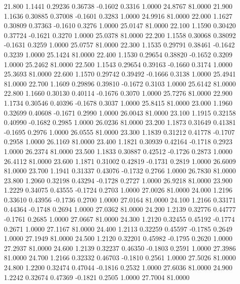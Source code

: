   21.800   1.1441   0.29236   0.36738  -0.1602   0.3316   1.0000  24.8767  81.0000
  21.900   1.1636   0.30885   0.37008  -0.1601   0.3283   1.0000  24.9916  81.0000
  22.000   1.1627   0.30809   0.37363  -0.1610   0.3276   1.0000  25.0147  81.0000
  22.100   1.1590   0.30420   0.37724  -0.1621   0.3270   1.0000  25.0378  81.0000
  22.200   1.1558   0.30068   0.38092  -0.1631   0.3259   1.0000  25.0757  81.0000
  22.300   1.1535   0.29791   0.38461  -0.1642   0.3239   1.0000  25.1424  81.0000
  22.400   1.1530   0.29654   0.38820  -0.1652   0.3209   1.0000  25.2462  81.0000
  22.500   1.1543   0.29654   0.39163  -0.1660   0.3174   1.0000  25.3693  81.0000
  22.600   1.1570   0.29742   0.39492  -0.1666   0.3138   1.0000  25.4941  81.0000
  22.700   1.1609   0.29896   0.39810  -0.1672   0.3103   1.0000  25.6142  81.0000
  22.800   1.1660   0.30130   0.40114  -0.1676   0.3070   1.0000  25.7276  81.0000
  22.900   1.1734   0.30546   0.40396  -0.1678   0.3037   1.0000  25.8415  81.0000
  23.000   1.1960   0.32699   0.40608  -0.1671   0.2990   1.0000  26.0043  81.0000
  23.100   1.1915   0.32158   0.40990  -0.1682   0.2985   1.0000  26.0236  81.0000
  23.200   1.1873   0.31649   0.41381  -0.1695   0.2976   1.0000  26.0555  81.0000
  23.300   1.1839   0.31212   0.41778  -0.1707   0.2958   1.0000  26.1169  81.0000
  23.400   1.1821   0.30939   0.42164  -0.1718   0.2923   1.0000  26.2374  81.0000
  23.500   1.1833   0.30887   0.42512  -0.1726   0.2873   1.0000  26.4112  81.0000
  23.600   1.1871   0.31002   0.42819  -0.1731   0.2819   1.0000  26.6009  81.0000
  23.700   1.1941   0.31337   0.43076  -0.1732   0.2766   1.0000  26.7830  81.0000
  23.800   1.2060   0.32198   0.43294  -0.1728   0.2727   1.0000  26.9218  81.0000
  23.900   1.2229   0.34075   0.43555  -0.1724   0.2703   1.0000  27.0026  81.0000
  24.000   1.2196   0.33610   0.43956  -0.1736   0.2700   1.0000  27.0164  81.0000
  24.100   1.2166   0.33171   0.44364  -0.1748   0.2694   1.0000  27.0362  81.0000
  24.200   1.2139   0.32776   0.44777  -0.1761   0.2685   1.0000  27.0667  81.0000
  24.300   1.2120   0.32455   0.45192  -0.1774   0.2671   1.0000  27.1167  81.0000
  24.400   1.2113   0.32259   0.45597  -0.1785   0.2649   1.0000  27.1949  81.0000
  24.500   1.2120   0.32201   0.45982  -0.1795   0.2620   1.0000  27.2937  81.0000
  24.600   1.2139   0.32237   0.46350  -0.1803   0.2591   1.0000  27.3986  81.0000
  24.700   1.2166   0.32332   0.46703  -0.1810   0.2561   1.0000  27.5026  81.0000
  24.800   1.2200   0.32474   0.47044  -0.1816   0.2532   1.0000  27.6036  81.0000
  24.900   1.2242   0.32674   0.47369  -0.1821   0.2505   1.0000  27.7004  81.0000
